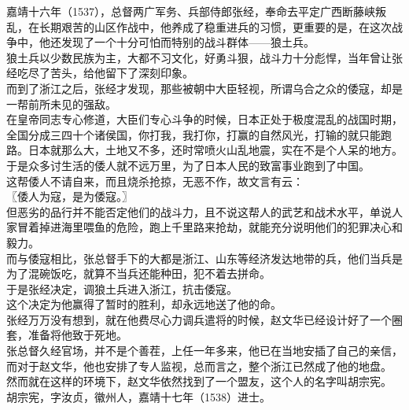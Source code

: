 \begin{multicols}{\theparacolNo}
嘉靖十六年（1537），总督两广军务、兵部侍郎张经，奉命去平定广西断藤峡叛乱，在长期艰苦的山区作战中，他养成了稳重进兵的习惯，更重要的是，在这次战争中，他还发现了一个十分可怕而特别的战斗群体——狼土兵。\\

狼土兵以少数民族为主，大都不习文化，好勇斗狠，战斗力十分彪悍，当年曾让张经吃尽了苦头，给他留下了深刻印象。\\

而到了浙江之后，张经才发现，那些被朝中大臣轻视，所谓乌合之众的倭寇，却是一帮前所未见的强敌。\\

在皇帝同志专心修道，大臣们专心斗争的时候，日本正处于极度混乱的战国时期，全国分成三四十个诸侯国，你打我，我打你，打赢的自然风光，打输的就只能跑路。日本就那么大，土地又不多，还时常喷火山乱地震，实在不是个人呆的地方。于是众多讨生活的倭人就不远万里，为了日本人民的致富事业跑到了中国。\\

这帮倭人不请自来，而且烧杀抢掠，无恶不作，故文言有云：\\

〖倭人为寇，是为倭寇。〗\\

但恶劣的品行并不能否定他们的战斗力，且不说这帮人的武艺和战术水平，单说人家冒着掉进海里喂鱼的危险，跑上千里路来抢劫，就能充分说明他们的犯罪决心和毅力。\\

而与倭寇相比，张总督手下的大都是浙江、山东等经济发达地带的兵，他们当兵是为了混碗饭吃，就算不当兵还能种田，犯不着去拼命。\\

于是张经决定，调狼土兵进入浙江，抗击倭寇。\\

这个决定为他赢得了暂时的胜利，却永远地送了他的命。\\

张经万万没有想到，就在他费尽心力调兵遣将的时候，赵文华已经设计好了一个圈套，准备将他致于死地。\\

张总督久经官场，并不是个善茬，上任一年多来，他已在当地安插了自己的亲信，而对于赵文华，他也安排了专人监视，总而言之，整个浙江已然成了他的地盘。\\

然而就在这样的环境下，赵文华依然找到了一个盟友，这个人的名字叫胡宗宪。\\

胡宗宪，字汝贞，徽州人，嘉靖十七年（1538）进士。\\


\end{multicols}
